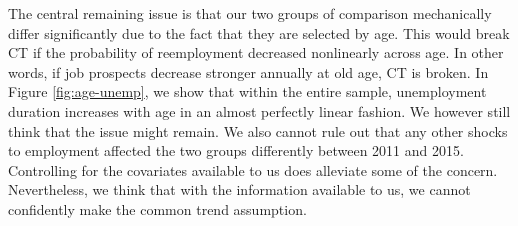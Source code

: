 \documentclass{scrartcl}
\begin{document}
\begin{itemize}[label=$\blacktriangleright$]
    The central remaining issue is that our two groups of comparison mechanically differ significantly due to the fact that they are selected by age. This would break CT if the probability of reemployment decreased nonlinearly across age. In other words, if job prospects decrease stronger annually at old age, CT is broken. In Figure \ref{fig:age-unemp}, we show that within the entire sample, unemployment duration increases with age in an almost perfectly linear fashion. We however still think that the issue might remain. We also cannot rule out that any other shocks to employment affected the two groups differently between 2011 and 2015. Controlling for the covariates available to us does alleviate some of the concern. Nevertheless, we think that with the information available to us, we cannot confidently make the common trend assumption.


\end{itemize}
\end{document}
